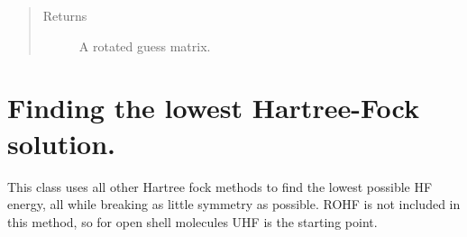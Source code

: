 \documentclass[letterpaper,10pt,english]{sphinxmanual}
\begin{document}
\begin{fulllineitems}
\begin{fulllineitems}
\begin{sphinxVerbatim}[commandchars=\\\{\}]
   
          
   
  
\end{sphinxVerbatim}
\begin{quote}\begin{description}
\item[{Returns}] \leavevmode
A rotated guess matrix.

\end{description}\end{quote}

\end{fulllineitems}


\end{fulllineitems}

\label{\detokenize{lowest_HF:module-hf.HartreeFock.lowest_HF}}

\chapter{Finding the lowest Hartree-Fock solution.}
\label{\detokenize{lowest_HF:finding-the-lowest-hartree-fock-solution}}\label{\detokenize{lowest_HF::doc}}
This class uses all other Hartree fock methods to find the lowest possible HF energy,
all while breaking as little symmetry as possible. ROHF is not included in this method, so for open shell molecules
UHF is the starting point.
\end{document}
